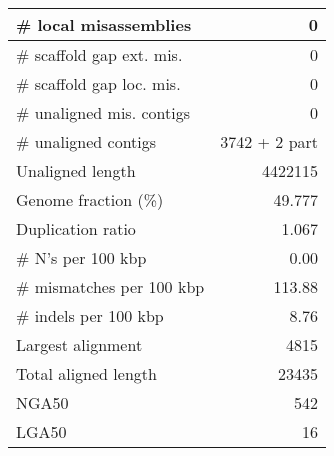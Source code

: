 \documentclass[12pt,a4paper]{article}
\begin{document}
\begin{table}[ht]
\begin{center}
\begin{tabular}{|l*{1}{|r}|}
\# local misassemblies & 0 \\ \hline
\# scaffold gap ext. mis. & 0 \\ \hline
\# scaffold gap loc. mis. & 0 \\ \hline
\# unaligned mis. contigs & 0 \\ \hline
\# unaligned contigs & 3742 + 2 part \\ \hline
Unaligned length & 4422115 \\ \hline
Genome fraction (\%) & 49.777 \\ \hline
Duplication ratio & 1.067 \\ \hline
\# N's per 100 kbp & 0.00 \\ \hline
\# mismatches per 100 kbp & 113.88 \\ \hline
\# indels per 100 kbp & 8.76 \\ \hline
Largest alignment & 4815 \\ \hline
Total aligned length & 23435 \\ \hline
NGA50 & 542 \\ \hline
LGA50 & 16 \\ \hline
\end{tabular}
\end{center}
\end{table}
\end{document}

